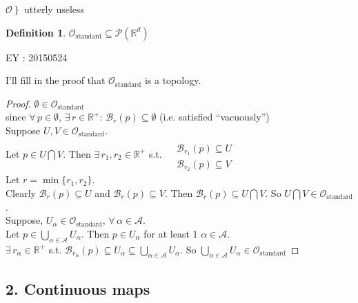 \documentclass[10pt]{amsart}
\newtheorem{definition}{Definition}
\begin{document}
\begin{multicols*}{2}
$ \left. \mathcal{O} \right\} $ utterly useless

\begin{definition}
	$\mathcal{O}_{\text{standard}} \subseteq \mathcal{P}(\mathbb{R}^d)$
\end{definition}

EY : 20150524 

I'll fill in the proof that $\mathcal{O}_{\text{standard}}$ is a topology.  

\begin{proof}
	$\emptyset \in \mathcal{O}_{\text{standard}}$ \\
	since $\forall \, p \in \emptyset$, $\exists \, r \in \mathbb{R}^+$: $\mathcal{B}_r(p) \subseteq \emptyset$ (i.e. satisfied ``vacuously'') \\
	
	Suppose $U,V \in \mathcal{O}_{\text{standard}}$.  \\
	Let $p \in U \bigcap V$.  Then $\exists \, r_1, r_2 \in \mathbb{R}^+$ s.t. $\begin{aligned} & \quad \\
	& \mathcal{B}_{r_1}(p) \subseteq U \\
	& \mathcal{B}_{r_2}(p) \subseteq V \end{aligned}$ \\
	
	Let $r=\min{ \lbrace r_1, r_2 \rbrace}$.   \\
	Clearly $\mathcal{B}_r(p) \subseteq U$ and $\mathcal{B}_r(p) \subseteq V$.  Then $\mathcal{B}_r(p) \subseteq U \bigcap V$.  So $U\bigcap V \in \mathcal{O}_{\text{standard}}$.   \\
	
	Suppose, $U_{\alpha} \in \mathcal{O}_{\text{standard}}$, $\forall \, \alpha \in \mathcal{A}$.  \\
	Let $p \in \bigcup_{\alpha \in \mathcal{A}} U_{\alpha}$.  Then $p \in U_{\alpha}$ for at least 1 $\alpha \in \mathcal{A}$.  \\
	\phantom{ \quad \, } $\exists \, r_{\alpha} \in \mathbb{R}^+$ s.t. $\mathcal{B}_{r_{\alpha}}(p) \subseteq U_{\alpha} \subseteq \bigcup_{\alpha \in \mathcal{A}} U_{\alpha}$.  So $\bigcup_{\alpha \in \mathcal{A}} U_{\alpha} \in \mathcal{O}_{\text{standard}}$  
\end{proof}


\subsection{2. Continuous maps}


\end{multicols*}
\end{document}
